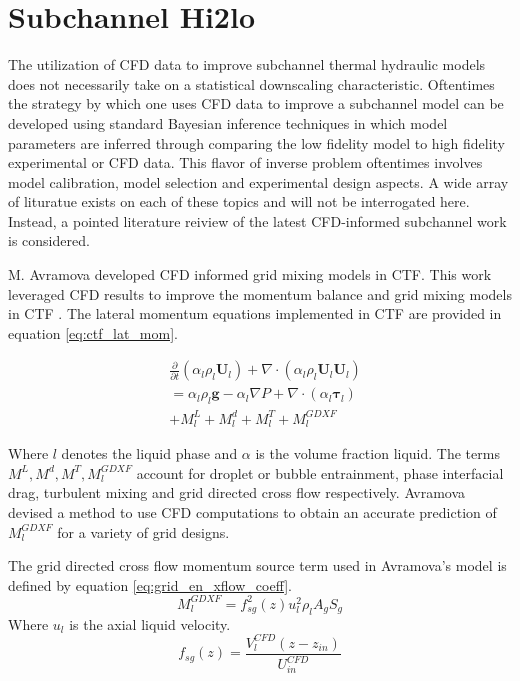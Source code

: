 
\section{Subchannel Hi2lo}

The utilization of CFD data to improve subchannel thermal hydraulic models does not necessarily take on a statistical downscaling characteristic.  Oftentimes the strategy by which one uses CFD data to improve a subchannel model can be developed using standard Bayesian inference techniques in which model parameters are inferred through comparing the low fidelity model to high fidelity experimental or CFD data.  This flavor of inverse problem oftentimes involves  model calibration, model selection and experimental design aspects.  A wide array of lituratue exists on each of these topics and will not be interrogated here.  Instead, a pointed literature reiview of the latest CFD-informed subchannel work is considered.

 M. Avramova developed CFD informed grid mixing models in CTF.  This work leveraged CFD results to improve the momentum balance and grid mixing models in CTF \cite{avramova2007}.  The lateral momentum equations implemented in CTF are provided in equation \ref{eq:ctf_lat_mom}.

    	\begin{align}
    	& \frac{\partial }{\partial t}(\alpha_l \rho_l \mathbf U_l)
    	+ \nabla \cdot (\alpha_l \rho_l \mathbf U_l \mathbf U_l) \nonumber \\
    	&= \alpha_l \rho_l \mathbf{g} - \alpha_l \nabla P + 
    	\nabla \cdot (\alpha_l \bm{\tau}_l) \nonumber \\
    	&+ M^L_l + M^d_l + M^T_l + M_l^{GDXF}
        \label{eq:ctf_lat_mom}
    	\end{align}
        
Where $l$ denotes the liquid phase and $\alpha$ is the volume fraction liquid.  The terms $M^L, M^d, M^T, M_l^{GDXF}$ account for droplet or bubble entrainment, phase interfacial drag, turbulent mixing and grid directed cross flow respectively.  Avramova devised a method to use CFD computations to obtain an accurate prediction of $M_l^{GDXF}$ for a variety of grid designs.
    	
The grid directed cross flow momentum source term used in Avramova's model is defined by equation \ref{eq:grid_en_xflow_coeff}.
    	\begin{equation}
    	M_l^{GDXF} = f^2_{sg}(z) u_l^2 \rho_l A_g S_g
        \label{eq:grid_en_xflow_coeff}
    	\end{equation}
    	Where $u_l$ is the axial liquid velocity. 
    	\begin{equation}
    	f_{sg}(z) = \frac{V^{CFD}_l(z-z_{in})}{U^{CFD}_{in}}
    	\end{equation}
    	
